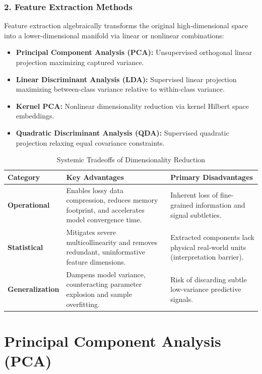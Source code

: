 \subsubsection{2. Feature Extraction Methods}
Feature extraction algebraically transforms the original high-dimensional space into a lower-dimensional manifold via linear or nonlinear combinations:
\begin{itemize}
    \item \textbf{Principal Component Analysis (PCA):} Unsupervised orthogonal linear projection maximizing captured variance.
    \item \textbf{Linear Discriminant Analysis (LDA):} Supervised linear projection maximizing between-class variance relative to within-class variance.
    \item \textbf{Kernel PCA:} Nonlinear dimensionality reduction via kernel Hilbert space embeddings.
    \item \textbf{Quadratic Discriminant Analysis (QDA):} Supervised quadratic projection relaxing equal covariance constraints.
\end{itemize}

\begin{table}[htbp]
\centering
\caption{Systemic Tradeoffs of Dimensionality Reduction}
\label{tab:dim_red_tradeoffs}
\vspace{0.2em}
\renewcommand{\arraystretch}{1.3}
\begin{tabularx}{\textwidth}{>{\bfseries}lXX}
\toprule
Category & Key Advantages & Primary Disadvantages \\
\midrule
Operational & Enables lossy data compression, reduces memory footprint, and accelerates model convergence time. & Inherent loss of fine-grained information and signal subtleties. \\
Statistical & Mitigates severe multicollinearity and removes redundant, uninformative feature dimensions. & Extracted components lack physical real-world units (interpretation barrier). \\
Generalization & Dampens model variance, counteracting parameter explosion and sample overfitting. & Risk of discarding subtle low-variance predictive signals. \\
\bottomrule
\end{tabularx}
\end{table}

\section{Principal Component Analysis (PCA)}

